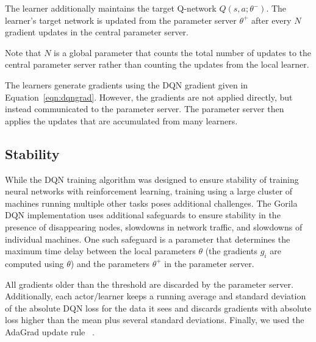 The learner additionally maintains the target Q-network $Q(s,a;\theta^-)$.
The learner's target network is updated from the parameter server $\theta^+$ after every $N$ gradient updates in the central parameter server.

Note that $N$ is a global parameter that counts the total number of updates to the central parameter server rather than counting the updates from the local learner.

The learners generate gradients using the DQN gradient given in Equation~\ref{eqn:dqngrad}. However, the gradients are not applied directly, but instead communicated to the parameter server. The parameter server then applies the updates that are accumulated from many learners.

\subsection{Stability}
While the DQN training algorithm was designed to ensure stability of training neural networks with reinforcement learning, training using a large cluster of machines running multiple other tasks poses additional challenges.
The Gorila DQN implementation uses additional safeguards to ensure stability in the presence of disappearing nodes, slowdowns in network traffic, and slowdowns of individual machines.
One such safeguard is a parameter that determines the maximum time delay between the local parameters $\theta$ (the gradients $g_i$ are computed using $\theta$) and the parameters $\theta^+$ in the parameter server.

All gradients older than the threshold are discarded by the parameter server.  Additionally, each actor/learner keeps a running average and standard deviation of the absolute DQN loss for the data it sees and discards gradients with absolute loss higher than the mean plus several standard deviations.  Finally, we used the AdaGrad update rule ~\cite{duchi2011adaptive}.


